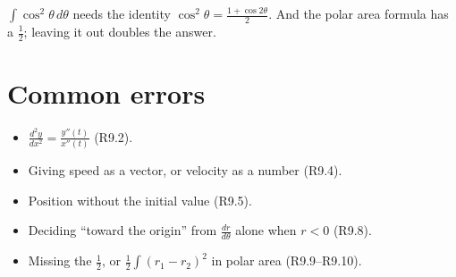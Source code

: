 \documentclass{apcalc}
\begin{document}
\begin{trap}
$\int\cos^2\theta\,d\theta$ needs the identity $\cos^2\theta=\frac{1+\cos2\theta}{2}$. And the polar area formula has a $\frac12$; leaving it out doubles the answer.
\end{trap}

\section{Common errors}
\begin{itemize}
\item $\frac{d^2y}{dx^2}=\frac{y''(t)}{x''(t)}$ (R9.2).
\item Giving speed as a vector, or velocity as a number (R9.4).
\item Position without the initial value (R9.5).
\item Deciding ``toward the origin'' from $\frac{dr}{d\theta}$ alone when $r<0$ (R9.8).
\item Missing the $\frac12$, or $\frac12\int(r_1-r_2)^2$ in polar area (R9.9--R9.10).
\end{itemize}
\end{document}
